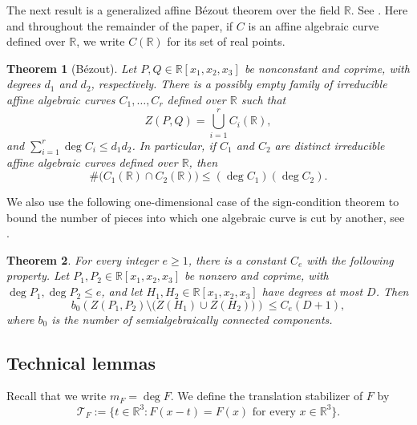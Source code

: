 \documentclass{amsart}%
\numberwithin{equation}{section}
\newtheorem{theorem}{Theorem}[section]
\newcommand{\R}{\mathbb{R}}
\newcommand{\1}{\mathbbm{1}}
\begin{document}
The next result is a generalized affine B\'ezout theorem over the field $\R$.
See \cite[Chapter~4]{BasuPollackRoy2006}. 
Here and throughout the remainder of the paper, if $C$ is an affine algebraic curve defined over $\R$, we write $C(\R)$ for its set of real points. 

\begin{theorem}[B\'ezout]\label{thm: Bezout}
Let $P,Q\in\R[x_1,x_2,x_3]$ be nonconstant and coprime, with degrees $d_1$ and $d_2$, respectively.
There is a possibly empty family of irreducible affine algebraic curves $C_1,\dots,C_r$ defined over $\R$ such that
\begin{equation}
\label{eq:bezout-decomposition}
    Z(P,Q)=\bigcup_{i=1}^r C_i(\R),
\end{equation}
and $\sum_{i=1}^r\deg C_i\leq d_1d_2$.
In particular, if $C_1$ and $C_2$ are distinct irreducible affine algebraic curves defined
over $\R$, then
\begin{equation}
\label{eq:curve-bezout}
    \#\bigl(C_1(\R)\cap C_2(\R)\bigr)  \leq(\deg C_1)(\deg C_2).
\end{equation}
\end{theorem}

We also use the following one-dimensional case of the sign-condition theorem to bound the number of pieces into which one algebraic curve is cut by another, see  \cite[Theorem 1.1]{BaroneBasu2012}.
\begin{theorem}
\label{thm:curve-cutting}
For every integer $e\geq1$, there is a constant $C_e$ with the following property.  
Let $P_1, P_2\in\R[x_1, x_2, x_3]$ be nonzero and coprime, with $\deg P_1, \deg P_2\leq e$, and let $H_1,H_2\in\R[x_1,x_2, x_3]$ have degrees at most $D$.  
Then
\begin{equation}
\nonumber
    b_0 \left( Z(P_1, P_2)\setminus \bigl( Z(H_1)\cup Z(H_2)\bigr)\right)
    \leq C_e(D+1),
\end{equation}
where $b_0$ is the number of semialgebraically connected components.
\end{theorem}


\bigskip 

\subsection{Technical lemmas}

Recall that we write $m_F=\deg F$. 
We define the translation stabilizer of $F$ by
\begin{equation}
\label{translation-stabilizer}
    \mathcal T_F:=\{t\in\R^3:F(x-t)=F(x)\text{ for every }x\in\R^3\}.
\end{equation}
\end{document}
